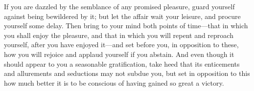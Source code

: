 If you  are dazzled by the  semblance of any promised  pleasure, guard yourself
against  being bewildered  by it;  but let  the affair  wait your  leisure, and
procure yourself some delay. Then bring to your mind both points of time---that
in which you  shall enjoy the pleasure,  and that in which you  will repent and
reproach  yourself,  after  you  have  enjoyed  it---and  set  before  you,  in
opposition to these, how you will  rejoice and applaud yourself if you abstain.
And even though  it should appear to you a  seasonable gratification, take heed
that its enticements and allurements and seductions may not subdue you, but set
in opposition to this how much better it is to be conscious of having gained so
great a victory.
